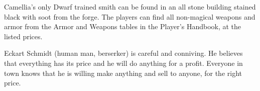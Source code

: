 Camellia's only Dwarf trained smith can be found in an all stone building stained black with soot from the forge.
The players can find all non-magical weapons and armor from the Armor and Weapons tables in the Player's Handbook, at the listed prices.

Eckart Schmidt (human man, berserker) is careful and conniving.
He believes that everything has its price and he will do anything for a profit.
Everyone in town knows that he is willing make anything and sell to anyone, for the right price.
